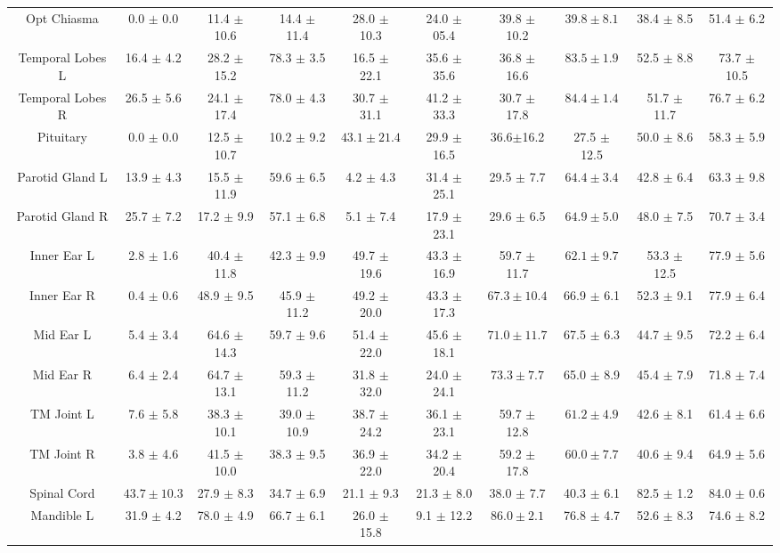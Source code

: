 \begin{table}[t!]
{\begin{subtable}{1\textwidth}
{\begin{tabular}{cccccccccc}
    Opt Chiasma&0.0 $\pm$ 0.0&11.4 $\pm$ 10.6&14.4 $\pm$ 11.4&28.0 $\pm$ 10.3&24.0 $\pm$ 05.4&39.8 $\pm$ 10.2&$\bm{39.8\pm8.1}$&38.4 $\pm$ 8.5&51.4 $\pm$ 6.2\\
    Temporal Lobes L&16.4 $\pm$ 4.2&28.2 $\pm$ 15.2&78.3 $\pm$ 3.5&16.5 $\pm$ 22.1&35.6 $\pm$ 35.6&36.8 $\pm$ 16.6&$\bm{83.5\pm1.9}$&52.5 $\pm$ 8.8&73.7 $\pm$ 10.5\\
    Temporal Lobes R&26.5 $\pm$ 5.6&24.1 $\pm$ 17.4&78.0 $\pm$ 4.3&30.7 $\pm$ 31.1&41.2 $\pm$ 33.3&30.7 $\pm$ 17.8&$\bm{84.4\pm1.4}$&51.7 $\pm$ 11.7&76.7 $\pm$ 6.2\\
    Pituitary&0.0 $\pm$ 0.0&12.5 $\pm$ 10.7&10.2 $\pm$ 9.2&$\bm{43.1 \pm 21.4}$&29.9 $\pm$ 16.5&36.6$\pm$16.2&27.5 $\pm$ 12.5&50.0 $\pm$ 8.6&58.3 $\pm$ 5.9\\
    Parotid Gland L&13.9 $\pm$ 4.3&15.5 $\pm$ 11.9&59.6 $\pm$ 6.5&4.2 $\pm$ 4.3&31.4 $\pm$ 25.1&29.5 $\pm$ 7.7&$\bm{64.4\pm3.4}$&42.8 $\pm$ 6.4&63.3 $\pm$ 9.8\\
    Parotid Gland R&25.7 $\pm$ 7.2&17.2 $\pm$ 9.9&57.1 $\pm$ 6.8&5.1 $\pm$ 7.4&17.9 $\pm$ 23.1&29.6 $\pm$ 6.5&$\bm{64.9\pm5.0}$&48.0 $\pm$ 7.5&70.7 $\pm$ 3.4\\
    Inner Ear L&2.8 $\pm$ 1.6&40.4 $\pm$ 11.8&42.3 $\pm$ 9.9&49.7 $\pm$ 19.6&43.3 $\pm$ 16.9&59.7 $\pm$ 11.7&$\bm{62.1\pm9.7}$&53.3 $\pm$ 12.5&77.9 $\pm$ 5.6\\
    Inner Ear R&0.4 $\pm$ 0.6&48.9 $\pm$ 9.5&45.9 $\pm$ 11.2&49.2 $\pm$ 20.0&43.3 $\pm$ 17.3&$\bm{67.3\pm10.4}$&66.9 $\pm$ 6.1&52.3 $\pm$ 9.1&77.9 $\pm$ 6.4\\
    Mid Ear L&5.4 $\pm$ 3.4&64.6 $\pm$ 14.3&59.7 $\pm$ 9.6&51.4 $\pm$ 22.0&45.6 $\pm$ 18.1&$\bm{71.0\pm11.7}$&67.5 $\pm$ 6.3&44.7 $\pm$ 9.5&72.2 $\pm$ 6.4\\
    Mid Ear R&6.4 $\pm$ 2.4&64.7 $\pm$ 13.1&59.3 $\pm$ 11.2&31.8 $\pm$ 32.0&24.0 $\pm$ 24.1&$\bm{73.3\pm7.7}$&65.0 $\pm$ 8.9&45.4 $\pm$ 7.9&71.8 $\pm$ 7.4\\
    TM Joint L&7.6 $\pm$ 5.8&38.3 $\pm$ 10.1&39.0 $\pm$ 10.9&38.7 $\pm$ 24.2&36.1 $\pm$ 23.1&59.7 $\pm$ 12.8&$\bm{61.2\pm4.9}$&42.6 $\pm$ 8.1&61.4 $\pm$ 6.6\\
    TM Joint R&3.8 $\pm$ 4.6&41.5 $\pm$ 10.0&38.3 $\pm$ 9.5&36.9 $\pm$ 22.0&34.2 $\pm$ 20.4&59.2 $\pm$ 17.8&$\bm{60.0\pm7.7}$&40.6 $\pm$ 9.4&64.9 $\pm$ 5.6\\
    Spinal Cord&$\bm{43.7\pm10.3}$&27.9 $\pm$ 8.3&34.7 $\pm$ 6.9&21.1 $\pm$ 9.3&21.3 $\pm$ 8.0&38.0 $\pm$ 7.7&40.3 $\pm$ 6.1&82.5 $\pm$ 1.2&84.0 $\pm$ 0.6\\
    Mandible L&31.9 $\pm$ 4.2&78.0 $\pm$ 4.9&66.7 $\pm$ 6.1&26.0 $\pm$ 15.8&9.1 $\pm$ 12.2&$\bm{86.0\pm2.1}$&76.8 $\pm$ 4.7&52.6 $\pm$ 8.3&74.6 $\pm$ 8.2\\

\end{tabular}}
\end{subtable}}
\end{table}
